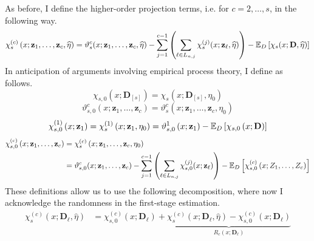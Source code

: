 As before, I define the higher-order projection terms, i.e. for $c = 2, \dotsc, s$, in the following way.
\begin{equation}
    \chi_{s}^{(c)}\left(x; \mathbf{z}_{1}, \dotsc, \mathbf{z}_{c}, \widehat{\eta}\right)
	= \vartheta_{s}^{c}(x; \mathbf{z}_{1}, \dotsc, \mathbf{z}_{c}, \widehat{\eta}) 
    - \sum_{j = 1}^{c-1}\left(\sum_{\ell \in L_{n,j}} \chi_{s}^{(j)}(x; \mathbf{z}_{\ell}, \widehat{\eta})\right) 
    - \mathbb{E}_{D}\left[\chi_{s}(x; \mathbf{D}, \widehat{\eta})\right]
\end{equation}
In anticipation of arguments involving empirical process theory, I define as follows.
\begin{equation}
    \chi_{s, 0}(x; \mathbf{D}_{[s]})
    = \chi_{s}(x; \mathbf{D}_{[s]}, \eta_{0})
\end{equation}
\begin{equation}
    \vartheta_{s,0}^{c}\left(x; \mathbf{z}_{1}, \dotsc, \mathbf{z}_{c}\right)
    = \vartheta_{s}^{c}\left(x; \mathbf{z}_{1}, \dotsc, \mathbf{z}_{c}, \eta_{0}\right)
\end{equation}
\begin{equation}
    \chi_{s,0}^{(1)}\left(x; \mathbf{z}_{1}\right)
	= \chi_{s}^{(1)}\left(x; \mathbf{z}_{1}, \eta_{0}\right)
    = \vartheta_{s,0}^{1}\left(x; \mathbf{z}_{1}\right) 
    - \mathbb{E}_{D}\left[\chi_{s,0}\left(x; \mathbf{D}\right)\right]
\end{equation}
\begin{equation}
    \begin{aligned}
        \chi_{s,0}^{(c)}\left(x; \mathbf{z}_{1}, \dotsc, \mathbf{z}_{c}\right)
	    & = \chi_{s}^{(c)}\left(x; \mathbf{z}_{1}, \dotsc, \mathbf{z}_{c}, \eta_{0}\right) \\
        & = \vartheta_{s,0}^{c}(x; \mathbf{z}_{1}, \dotsc, \mathbf{z}_{c}) 
        - \sum_{j = 1}^{c-1}\left(\sum_{\ell \in L_{n,j}} \chi_{s,0}^{(j)}(x; \mathbf{z}_{\ell})\right) 
        - \mathbb{E}_{D}\left[\chi_{s,0}^{(c)}\left(x; Z_{1}, \dotsc, Z_{c}\right)\right]
    \end{aligned}
\end{equation}
These definitions allow us to use the following decomposition, where now I acknowledge the randomness in the first-stage estimation.
\begin{equation}\label{eq:DNNDML2_ResidDecomp}
    \begin{aligned}
        \chi_{s}^{(c)}\left(x; \mathbf{D}_{\ell}, \hat{\eta}\right)
        & = \chi_{s,0}^{(c)}\left(x; \mathbf{D}_{\ell}\right) + \underbrace{\chi_{s}^{(c)}\left(x; \mathbf{D}_{\ell}, \hat{\eta}\right) - \chi_{s,0}^{(c)}\left(x; \mathbf{D}_{\ell}\right)}_{R_{c}\left(x; \mathbf{D}_{\ell}\right)}
    \end{aligned}
\end{equation}

